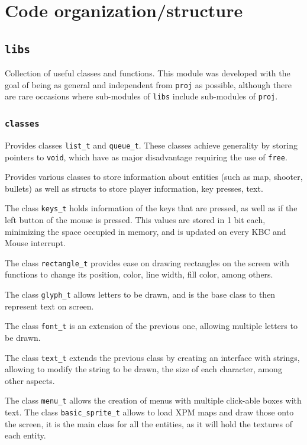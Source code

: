 \documentclass{article}
\theoremstyle{remark}
\begin{document}
\section{Code organization/structure}
\subsection{\texttt{libs}}
Collection of useful classes and functions. This module was developed with the goal of being as general and independent from \texttt{proj} as possible, although there are rare occasions where sub-modules of \texttt{libs} include sub-modules of \texttt{proj}.
\subsubsection{\texttt{classes}}
Provides classes \texttt{list\_t} and \texttt{queue\_t}. These classes achieve generality by storing pointers to \texttt{void}, which have as major disadvantage requiring the use of \texttt{free}. \par
Provides various classes to store information about entities (such as map, shooter, bullets)
as well as structs to store player information, key presses, text.\par
The class \texttt{keys\_t} holds information of the keys that are pressed, as well as if the left button of the mouse is pressed. This values are stored in 1 bit each, minimizing the space occupied in memory, and is updated on every KBC and Mouse interrupt.\par
The class \texttt{rectangle\_t}	provides ease on drawing rectangles on the screen with functions to change its position, color, line width, fill color, among others.\par
The class \texttt{glyph\_t} allows letters to be drawn, and is the base class to then represent text on screen.\par
The class \texttt{font\_t} is an extension of the previous one, allowing multiple letters to be drawn.\par
The class \texttt{text\_t} extends the previous class by creating an interface with strings, allowing to modify the string to be drawn, the size of each character, among other aspects.\par
The class \texttt{menu\_t} allows the creation of menus with multiple click-able boxes with text.
The class \texttt{basic\_sprite\_t} allows to load XPM maps and draw those onto the screen, it is the main class for all the entities, as it will hold the textures of each entity.\par
\end{document}
